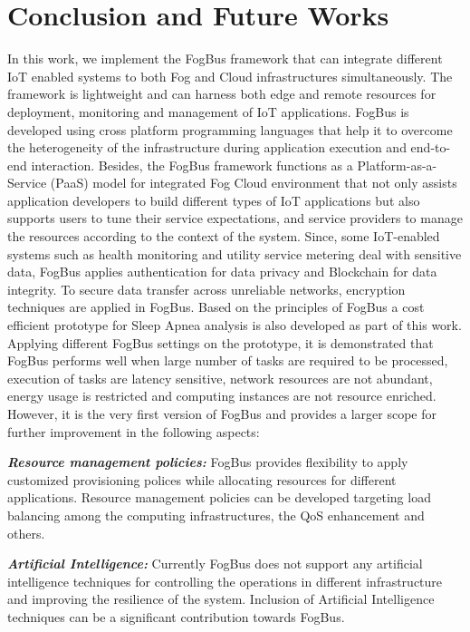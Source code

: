 \documentclass[final,5p,times,twocolumn]{elsarticle}
\begin{document}
\section{Conclusion and Future Works} \label{future}
In this work, we implement the FogBus framework that can integrate different IoT enabled systems to both Fog and Cloud infrastructures simultaneously. The framework is lightweight and can harness both edge and remote resources for deployment, monitoring and management of IoT applications. FogBus is developed using cross platform programming languages that help it to overcome the heterogeneity of the infrastructure during application execution and end-to-end interaction. Besides, the FogBus framework functions as a Platform-as-a-Service (PaaS) model for integrated Fog Cloud environment that not only assists application developers to build different types of IoT applications but also supports users to tune their service expectations, and service providers to manage the resources according to the context of the system. Since, some IoT-enabled systems such as health monitoring and utility service metering deal with sensitive data, FogBus applies authentication for data privacy and Blockchain for data integrity. To secure data transfer across unreliable networks, encryption techniques are applied in FogBus. Based on the principles of FogBus a cost efficient prototype for Sleep Apnea analysis is also developed as part of this work. Applying different FogBus settings on the prototype, it is demonstrated that FogBus performs well when large number of tasks are required to be processed, execution of tasks are latency sensitive, network resources are not abundant, energy usage is restricted and computing instances are not resource enriched. However, it is the very first version of FogBus and provides a larger scope for further improvement in the following aspects: 
\par \textbf{\textit{Resource management policies:}} FogBus provides flexibility to apply customized  provisioning polices while allocating resources for different applications. Resource management policies can be developed targeting load balancing among the computing infrastructures, the QoS enhancement and others.  
\par \textbf{\textit{Artificial Intelligence:}} Currently FogBus does not support any artificial intelligence techniques for controlling the operations in different infrastructure and improving the resilience of the system. Inclusion of Artificial Intelligence techniques can be a significant contribution towards FogBus. 
\end{document}
